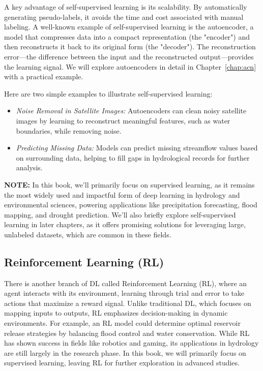 A key advantage of self-supervised learning is its scalability. By automatically generating pseudo-labels, it avoids the time and cost associated with manual labeling. A well-known example of self-supervised learning is the autoencoder, a model that compresses data into a compact representation (the "encoder") and then reconstructs it back to its original form (the "decoder"). The reconstruction error—the difference between the input and the reconstructed output—provides the learning signal. We will explore autoencoders in detail in Chapter~\ref{chap:acn} with a practical example.

Here are two simple examples to illustrate self-supervised learning:

\begin{itemize}
    \item \textit{Noise Removal in Satellite Images:} Autoencoders can clean noisy satellite images by learning to reconstruct meaningful features, such as water boundaries, while removing noise.
    \item \textit{Predicting Missing Data:} Models can predict missing streamflow values based on surrounding data, helping to fill gaps in hydrological records for further analysis.
\end{itemize}

\textbf{NOTE:} In this book, we’ll primarily focus on supervised learning, as it remains the most widely used and impactful form of deep learning in hydrology and environmental sciences, powering applications like precipitation forecasting, flood mapping, and drought prediction. We’ll also briefly explore self-supervised learning in later chapters, as it offers promising solutions for leveraging large, unlabeled datasets, which are common in these fields.

\subsection{Reinforcement Learning (RL)}
There is another branch of DL called Reinforcement Learning (RL), where an agent interacts with its environment, learning through trial and error to take actions that maximize a reward signal. Unlike traditional DL, which focuses on mapping inputs to outputs, RL emphasizes decision-making in dynamic environments. For example, an RL model could determine optimal reservoir release strategies by balancing flood control and water conservation. While RL has shown success in fields like robotics and gaming, its applications in hydrology are still largely in the research phase. In this book, we will primarily focus on supervised learning, leaving RL for further exploration in advanced studies.




























